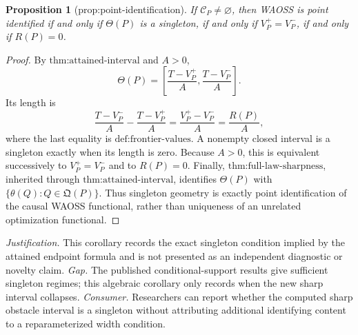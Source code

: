 \documentclass{article}
\newtheorem{proposition}{Proposition}
\begin{document}
\begin{proposition}[prop:point-identification]\label{prop:point-identification}
If \(\mathcal C_P\neq\varnothing\), then WAOSS is point identified if and only if \(\Theta(P)\) is a singleton, if and only if \(V_P^+=V_P^-\), if and only if \(R(P)=0\).
\end{proposition}
\begin{proof}
By \(\text{thm:attained-interval}\) and \(A>0\),
\[
 \Theta(P)=
 \left[\frac{T-V_P^+}{A},\frac{T-V_P^-}{A}\right].
\]
Its length is
\[
 \frac{T-V_P^-}{A}-\frac{T-V_P^+}{A}
 =\frac{V_P^+-V_P^-}{A}
 =\frac{R(P)}{A},
\]
where the last equality is \(\text{def:frontier-values}\).  A nonempty closed interval is a singleton exactly when its length is zero.  Because \(A>0\), this is equivalent successively to \(V_P^+=V_P^-\) and to \(R(P)=0\).  Finally, \(\text{thm:full-law-sharpness}\), inherited through \(\text{thm:attained-interval}\), identifies \(\Theta(P)\) with \(\{\theta(Q):Q\in\mathfrak Q(P)\}\).  Thus singleton geometry is exactly point identification of the causal WAOSS functional, rather than uniqueness of an unrelated optimization functional.
\end{proof}
\par\smallskip\noindent \textit{Justification.} This corollary records the exact singleton condition implied by the attained endpoint formula and is not presented as an independent diagnostic or novelty claim. \textit{Gap.} The published conditional-support results give sufficient singleton regimes; this algebraic corollary only records when the new sharp interval collapses. \textit{Consumer.} Researchers can report whether the computed sharp obstacle interval is a singleton without attributing additional identifying content to a reparameterized width condition.
\end{document}
